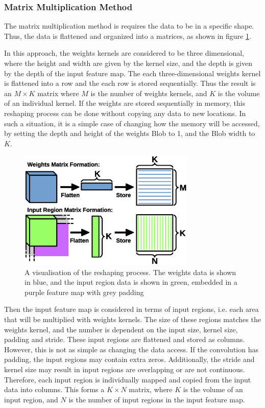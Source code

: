 \documentclass[12pt]{article}
\begin{document}
\subsubsection{Matrix Multiplication Method}
\label{sec:Imp-Conv-MM}

The matrix multiplication method is requires the data to be in a specific shape. Thus, the data is flattened and organized into a matrices, as shown in figure \ref{fig:im2col}. 

In this approach, the weights kernels are considered to be three dimensional, where the height and width are given by the kernel size, and the depth is given by the depth of the input feature map. The each three-dimensional weights kernel is flattened into a row and the each row is stored sequentially. Thus the result is an $M \times K$ matrix where $M$ is the number of weights kernels, and $K$ is the volume of an individual kernel. If the weights are stored sequentially in memory, this reshaping process can be done without copying any data to new locations. In such a situation, it is a simple case of changing how the memory will be accessed, by setting the depth and height of the weights Blob to 1, and the Blob width to $K$.

\begin{figure}[h]
\centering
\includegraphics[width=0.75\textwidth]{figures/im2col.eps}
\caption{A visualisation of the reshaping process. The weights data is shown in blue, and the input region data is shown in green, embedded in a purple feature map with grey padding} \label{fig:im2col}
\end{figure}

Then the input feature map is considered in terms of input regions, i.e. each area that will be multiplied with weights kernels. The size of these regions matches the weights kernel, and the number is dependent on the input size, kernel size, padding and stride.  These input regions are flattened and stored as columns. However, this is not as simple as changing the data access. If the convolution has padding, the input regions may contain extra zeros. Additionally, the stride and kernel size may result in input regions are overlapping or are not continuous. Therefore, each input region is individually mapped and copied from the input data into columns. This forms a $K \times N$ matrix, where $K$ is the volume of an input region, and $N$ is the number of input regions in the input feature map.
\end{document}
